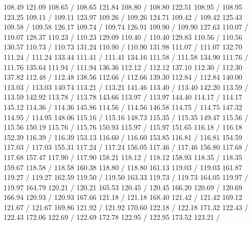 { 108.49 121.09 108.65 /
 108.65 121.84 108.80 /
 108.80 122.51 108.95 /
 108.95 123.25 109.11 /
 109.11 123.97 109.26 /
 109.26 124.71 109.42 /
 109.42 125.43 109.58 /
 109.58 126.17 109.74 /
 109.74 126.91 109.90 /
 109.90 127.63 110.07 /
 110.07 128.37 110.23 /
 110.23 129.09 110.40 /
 110.40 129.83 110.56 /
 110.56 130.57 110.73 /
 110.73 131.24 110.90 /
 110.90 131.98 111.07 /
 111.07 132.70 111.24 /
 111.24 133.44 111.41 /
 111.41 134.16 111.58 /
 111.58 134.90 111.76 /
 111.76 135.64 111.94 /
 111.94 136.36 112.12 /
 112.12 137.10 112.30 /
 112.30 137.82 112.48 /
 112.48 138.56 112.66 /
 112.66 139.30 112.84 /
 112.84 140.00 113.03 /
 113.03 140.74 113.21 /
 113.21 141.46 113.40 /
 113.40 142.20 113.59 /
 113.59 142.92 113.78 /
 113.78 143.66 113.97 /
 113.97 144.40 114.17 /
 114.17 145.12 114.36 /
 114.36 145.86 114.56 /
 114.56 146.58 114.75 /
 114.75 147.32 114.95 /
 114.95 148.06 115.16 /
 115.16 148.73 115.35 /
 115.35 149.47 115.56 /
 115.56 150.19 115.76 /
 115.76 150.93 115.97 /
 115.97 151.65 116.18 /
 116.18 152.39 116.39 /
 116.39 153.13 116.60 /
 116.60 153.85 116.81 /
 116.81 154.59 117.03 /
 117.03 155.31 117.24 /
 117.24 156.05 117.46 /
 117.46 156.80 117.68 /
 117.68 157.47 117.90 /
 117.90 158.21 118.12 /
 118.12 158.93 118.35 /
 118.35 159.67 118.58 /
 118.58 160.38 118.80 /
 118.80 161.13 119.03 /
 119.03 161.87 119.27 /
 119.27 162.59 119.50 /
 119.50 163.33 119.73 /
 119.73 164.05 119.97 /
 119.97 164.79 120.21 /
 120.21 165.53 120.45 /
 120.45 166.20 120.69 /
 120.69 166.94 120.93 /
 120.93 167.66 121.18 /
 121.18 168.40 121.42 /
 121.42 169.12 121.67 /
 121.67 169.86 121.92 /
 121.92 170.60 122.18 /
 122.18 171.32 122.43 /
 122.43 172.06 122.69 /
 122.69 172.78 122.95 /
 122.95 173.52 123.21 /
}
